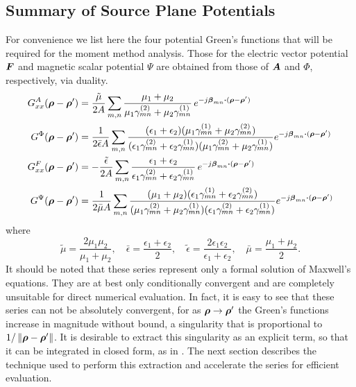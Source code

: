 \subsection{Summary of Source Plane Potentials}
For convenience we list here the four potential Green's functions that will
be required for the moment method analysis.  Those for the
 electric vector 
potential $\boldsymbol{F}$ and magnetic scalar potential $\Psi$ are obtained from
those of $\boldsymbol{A}$ and $\Phi$, respectively, via duality.
\begin{subequations}
  \label{eq:allpots}
\begin{align}
  G^A_{xx}(\vecrho-\vecrho') & =
  \frac{\tilde{\mu}}{2A} \summn
  \frac{\mu_1 + \mu_2}%
  {\mu_1\gamma\two_{mn}+\mu_2\gamma\one_{mn}} \,
  e^{-j\vecbeta_{mn} \bdot (\vecrho-\vecrho')}  \label{eq:allpots:A}\\
  G^\Phi(\vecrho-\vecrho') &= 
  \frac{1}{2\bar{\epsilon}A} \summn
  \frac{(\epsilon_1+\epsilon_2)(\mu_1\gamma\one_{mn} + \mu_2\gamma\two_{mn})}%
  {(\epsilon_1\gamma\two_{mn}+\epsilon_2\gamma\one_{mn})
    (\mu_1\gamma\two_{mn}+\mu_2\gamma\one_{mn}) }
  e^{-j\vecbeta_{mn} \bdot (\vecrho-\vecrho')} \label{eq:allpots:Phi} \\
  G^F_{xx}(\vecrho-\vecrho') & = -
  \frac{\tilde{\epsilon}}{2A} \summn
  \frac{\epsilon_1 + \epsilon_2}%
  {\epsilon_1\gamma\two_{mn}+\epsilon_2\gamma\one_{mn}} \,
  e^{-j\vecbeta_{mn} \bdot (\vecrho-\vecrho')} \\
  G^\Psi(\vecrho-\vecrho') &= 
  \frac{1}{2\bar{\mu}A} \summn
  \frac{(\mu_1+\mu_2)(\epsilon_1\gamma\one_{mn} + \epsilon_2\gamma\two_{mn})}%
  {(\mu_1\gamma\two_{mn}+\mu_2\gamma\one_{mn})
    (\epsilon_1\gamma\two_{mn}+\epsilon_2\gamma\one_{mn}) }
  e^{-j\vecbeta_{mn} \bdot (\vecrho-\vecrho')}
  \end{align}
\end{subequations}
where
\begin{equation}
  \tilde{\mu} =
  \frac{2\mu_1\mu_2}{\mu_1+\mu_2},
  \quad
  \bar{\epsilon} = \frac{\epsilon_1 + \epsilon_2}{2},
  \quad
  \tilde{\epsilon} =
  \frac{2\epsilon_1\epsilon_2}{\epsilon_1+\epsilon_2},
  \quad
  \bar{\mu} = \frac{\mu_1 + \mu_2}{2}.
\end{equation}
It should be noted that these series represent only a formal solution
of Maxwell's equations.  They are at best only conditionally
convergent and are completely unsuitable for direct numerical
evaluation.  In fact, it is easy to see that these series can not be
absolutely convergent, for as $\boldsymbol{\rho}\rightarrow\boldsymbol{\rho}'$ the
Green's functions increase in magnitude without bound, a singularity
that is proportional to $1/\left\lVert\boldsymbol{\rho}-\boldsymbol{\rho}'\right\rVert$.  It is desirable
to extract this singularity as an explicit term, so that it can be
integrated in closed form, as in \cite{wrgs:84}.
 The next section describes the technique used to perform this
 extraction and
accelerate the series for efficient evaluation.

